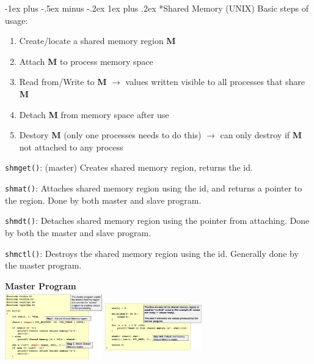 \documentclass[10pt,landscape]{article}
\makeatletter
\renewcommand{\subsubsection}{\@startsection{subsubsection}{3}{0mm}%
                                {-1ex plus -.5ex minus -.2ex}%
                                {1ex plus .2ex}%
                                {\normalfont\small\bfseries}}
\makeatother
\begin{document}
\begin{multicols*}{3}
\subsubsection*{Shared Memory (UNIX)}
Basic steps of usage:
\begin{enumerate}[topsep=0pt,noitemsep,wide=0pt, leftmargin=\dimexpr\labelwidth + 2\labelsep\relax, topsep=0pt]
    \item Create/locate a shared memory region \textbf{M}
    \item Attach \textbf{M} to process memory space
    \item Read from/Write to \textbf{M} $\rightarrow$ values written visible to all processes that share \textbf{M}
    \item Detach \textbf{M} from memory space after use
    \item Destory \textbf{M} (only one processes needs to do this) $\rightarrow$ can only destroy if \textbf{M} not attached to any process
\end{enumerate}

\verb|shmget()|: (master) Creates shared memory region, returns the id.

\verb|shmat()|: Attaches shared memory region using the id, and returns a pointer to the region. Done by both master and slave program.

\verb|shmdt()|: Detaches shared memory region using the pointer from attaching. Done by both the master and slave program.

\verb|shmctl()|: Destroys the shared memory region using the id. Generally done by the master program.

\textbf{Master Program} \\ 
\includegraphics*[width=4.2cm, height=3cm]{images/masterprogram.png}
\includegraphics*[width=4.2cm, height=3cm]{images/masterprogram2.png}


\end{multicols*}
\end{document}
